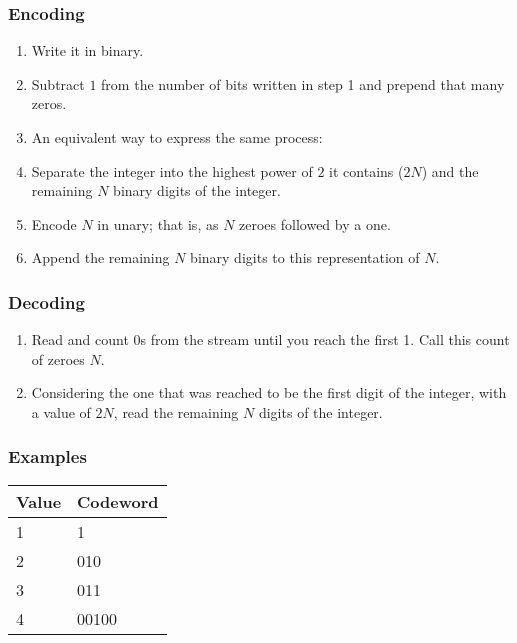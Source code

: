 \documentclass[a4paper]{article}
\begin{document}
\subsubsection*{Encoding}

\begin{enumerate}
\item Write it in binary.

\item Subtract $1$ from the number of bits written in step 1 and prepend that many zeros.

\item An equivalent way to express the same process:

\item Separate the integer into the highest power of $2$ it contains ($2N$) and the remaining 
$N$ binary digits of the integer.

\item Encode $N$ in unary; that is, as $N$ zeroes followed by a one.

\item Append the remaining $N$ binary digits to this representation of $N$.
\end{enumerate}

\subsubsection*{Decoding}

\begin{enumerate}
\item Read and count 0s from the stream until you reach the first 1. Call this count 
of zeroes $N$.

\item Considering the one that was reached to be the first digit of the integer, with 
a value of $2N$, read the remaining $N$ digits of the integer.
\end{enumerate}

\subsubsection*{Examples}

\begin{tabular}{|>{\raggedright}p{76pt}|>{\raggedright}p{107pt}|}
\hline
\textbf{Value} & \textbf{Codeword}\tabularnewline
\hline
1 & 1\tabularnewline
\hline
2 & 010\tabularnewline
\hline
3 & 011\tabularnewline
\hline
4 & 00100\tabularnewline
\hline
\end{tabular}
\end{document}
